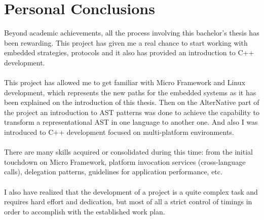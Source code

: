 \section{Personal Conclusions}\label{S:Personal-Conclusions}
Beyond academic achievements, all the process involving this bachelor's thesis has been rewarding. This project has given me a real chance to start working with embedded strategies, protocols and it also has provided an introduction to C++ development.
\\
\\
This project has allowed me to get familiar with Micro Framework and Linux development, which represents the new paths for the embedded systems as it has been explained on the introduction of this thesis. Then on the AlterNative part of the project an introduction to AST patterns was done to achieve the capability to transform a representational AST in one language to another one. And also I was introduced to C++ development focused on multi-platform environments.
\\
\\
There are many skills acquired or consolidated during this time: from the initial touchdown on Micro Framework, platform invocation services (cross-language calls), delegation patterns, guidelines for application performance, etc.
\\
\\
I also have realized that the development of a project is a quite complex task and requires hard effort and dedication, but most of all a strict control of timings in order to accomplish with the established work plan.

